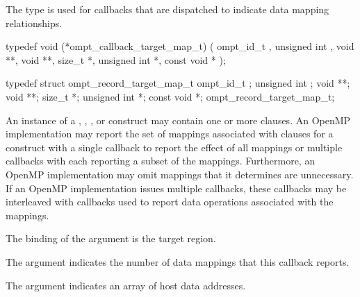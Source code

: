 \label{sec:ompt_callback_target_map_t}
\summary
The  type is used for callbacks that are
dispatched to indicate data mapping relationships.

\format
\begin{ccppspecific}
\begin{omptCallback}
typedef void (*ompt_callback_target_map_t) (
  ompt_id_t ,
  unsigned int ,
  void **,
  void **,
  size_t *,
  unsigned int *,
  const void *
);
\end{omptCallback}
\end{ccppspecific}

\record
\begin{ccppspecific}
\begin{omptRecord}
typedef struct ompt_record_target_map_t {
  ompt_id_t ;
  unsigned int ;
  void **;
  void **;
  size_t *;
  unsigned int *;
  const void *;
} ompt_record_target_map_t;
\end{omptRecord}
\end{ccppspecific}

\descr
An instance of a , , , or 
 construct may contain one or more  clauses.
An OpenMP implementation may report the set of mappings associated with  
clauses for a construct with a single  callback to 
report the effect of all mappings or multiple  
callbacks with each reporting a subset of the mappings. Furthermore, an OpenMP 
implementation may omit mappings that it determines are unnecessary. If an OpenMP 
implementation issues multiple  callbacks, these 
callbacks may be interleaved with  callbacks
used to report data operations associated with the mappings.

\argdesc
The binding of the  argument is the target region.

The  argument indicates the number of data mappings that 
this callback reports.

The  argument indicates an array of host data addresses.

